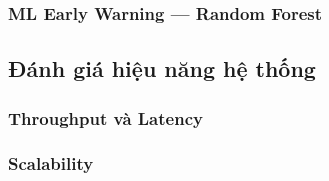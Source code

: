 \subsubsection{ML Early Warning — Random Forest}


\subsection{Đánh giá hiệu năng hệ thống}

\subsubsection{Throughput và Latency}


\subsubsection{Scalability}

